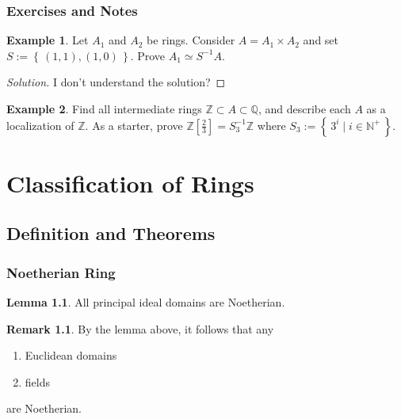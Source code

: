 \documentclass[a4paper]{book}
\theoremstyle{definition}
\newtheorem{example}{Example}[definition]
\newtheorem{lemma}[definition]{Lemma}
\newtheorem*{remark}{Remark}
\newcommand{\set}[1]{\left\{\, #1 \,\right\}}
\newcommand{\makeset}[2]{\left\{\, #1 \mid #2 \,\right\}}
\begin{document}
\subsection*{Exercises and Notes}

\begin{example}
    Let \(A_1\) and \(A_2\) be rings. Consider \(A = A_1 \times A_2\) and set \(S := \set{(1, 1), (1, 0)}\). Prove \(A_1 \simeq S^{-1}A\).
\end{example}

\begin{proof}[Solution]
    I don't understand the solution?
\end{proof}


\begin{example}
    Find all intermediate rings \(\mathbb{Z} \subset A \subset \mathbb{Q}\), and describe each \(A\) as a localization of \(\mathbb{Z}\). As a starter, prove \(\mathbb{Z}\left[\frac{2}{3}\right] = S_3^{-1} \mathbb{Z}\) where \(S_3 := \makeset{3^i}{i \in \mathbb{N}^+}\).
\end{example}






\chapter{Classification of Rings}
\section{Definition and Theorems}
\subsection{Noetherian Ring}

\begin{thmbox}
    \begin{lemma}
        All principal ideal domains are Noetherian.
    \end{lemma}
\end{thmbox}

\begin{rembox}
    \begin{remark}
        By the lemma above, it follows that any
        \begin{enumerate}
            \item Euclidean domains
            \item fields
        \end{enumerate}
        are Noetherian.
    \end{remark}
\end{rembox}
\end{document}
